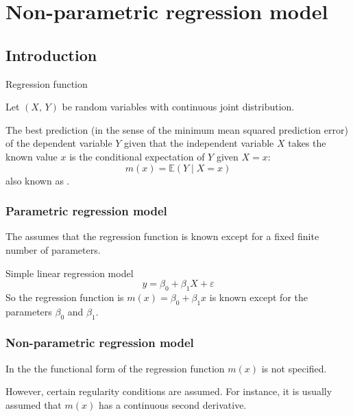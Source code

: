 \chapter{Non-parametric regression model}

\section{Introduction}

\begin{definition}{Regression function}{}

	Let $(X,\, Y)$ be random variables with continuous joint distribution.

	The best prediction (in the sense of the minimum mean squared prediction error)
	of the dependent variable $Y$ given that the independent variable $X$ takes
	the known value $x$ is the conditional expectation of $Y$ given $X=x$:
	\begin{equation*}
		m(x) = \mathds{E}( Y \mid X = x)
	\end{equation*}
	also known as .
\end{definition}

\subsection{Parametric regression model}

The  assumes that the regression function
is known except for a fixed finite number of parameters.

\begin{example}{Simple linear regression model}{}
	\begin{equation*}
		y = \beta_0 + \beta_1 X + \varepsilon
	\end{equation*}
	So the regression function is $m(x) = \beta_0 + \beta_1 x$ is known except
	for the parameters $\beta_0$ and $\beta_1$.
\end{example}

\subsection{Non-parametric regression model}

In the  the functional form of the
regression function $m(x)$ is not specified.

\begin{note}
	However, certain regularity conditions are assumed. For instance,
	it is usually assumed that $m(x)$ has a continuous second derivative.
\end{note}


